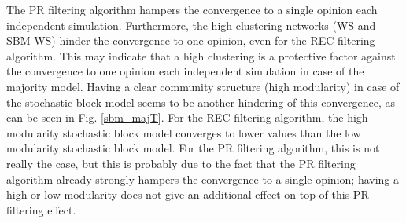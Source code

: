 \documentclass[11 pt , letterpaper , twoside , openright]{book}
\begin{document}
\newline
The PR filtering algorithm hampers the convergence to a single opinion each independent simulation. Furthermore, the high clustering networks (WS and SBM-WS) hinder the convergence to one opinion, even for the REC filtering algorithm. This may indicate that a high clustering is a protective factor against the convergence to one opinion each independent simulation in case of the majority model. Having a clear community structure (high modularity) in case of the stochastic block model seems to be another hindering of this convergence, as can be seen in Fig. \ref{sbm_majT}.  For the REC filtering algorithm, the high modularity stochastic block model converges to lower values than the low modularity stochastic block model. For the PR filtering algorithm, this is not really the case, but this is probably due to the fact that the PR filtering algorithm already strongly hampers the convergence to a single opinion; having a high or low modularity does not give an additional effect on top of this PR filtering effect.
\end{document}
